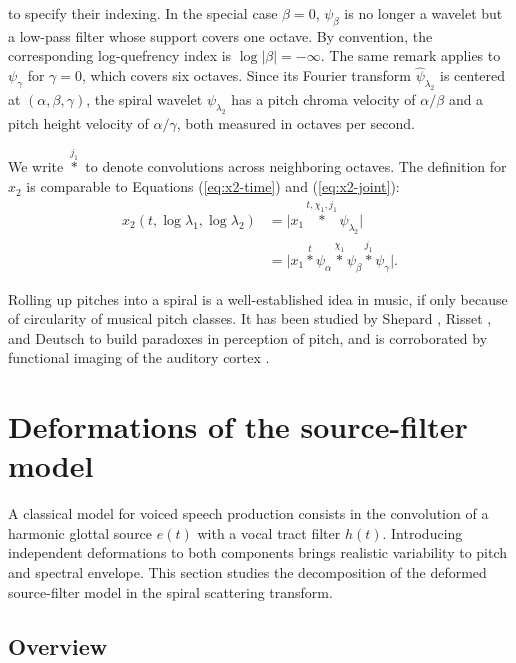 \documentclass[twoside,a4paper]{article}
\begin{document}
to specify their indexing. In the special case $\beta = 0$, $\psi_\beta$ is no longer a wavelet but a low-pass filter whose support covers one octave. By convention, the corresponding log-quefrency index is $\log \vert \beta \vert = - \infty$. The same remark applies to $\psi_{\gamma}$ for $\gamma=0$, which covers six octaves. Since its Fourier transform $\widehat{\psi}_{\lambda_2}$  is centered at $(\alpha,\beta,\gamma)$, the spiral wavelet $\psi_{\lambda_2}$ has a pitch chroma velocity of $\alpha/\beta$ and a pitch height velocity of $\alpha/\gamma$, both measured in octaves per second.

We write $\overset{j_{1}}{\ast}$ to denote convolutions across neighboring octaves.
The definition for $x_2$ is comparable to Equations (\ref{eq:x2-time}) and (\ref{eq:x2-joint}):
\begin{equation}
\begin{split}
x_{2}(t,\log \lambda_{1},\log \lambda_{2})
& = \vert x_{1} \overset{t,\chi_{1},j_{1}}{\ast} \psi_{\lambda_{2}}\vert \\
&= \vert x_{1} \overset{t}{\ast} \psi_\alpha \overset{\chi_{1}}{\ast} \psi_\beta \overset{j_{1}}{\ast} \psi_\gamma \vert
.
\end{split}
\label{eq:x2-spiral}
\end{equation}

Rolling up pitches into a spiral is a well-established idea in music, if only because of circularity of musical pitch classes. It has been studied by Shepard \cite{Shepard1964}, Risset \cite{Risset1969}, and Deutsch \cite{Deutsch2008} to build paradoxes in perception of pitch, and is corroborated by functional imaging of the auditory cortex \cite{Warren2003}.





\section{Deformations of the source-filter model}
A classical model for voiced speech production consists in the convolution of a harmonic glottal source $e(t)$ with a vocal tract filter $h(t)$.
Introducing independent deformations to both components brings realistic variability to pitch and spectral envelope.
This section studies the decomposition of the deformed source-filter model in the spiral scattering transform.

\subsection{Overview}
\end{document}
